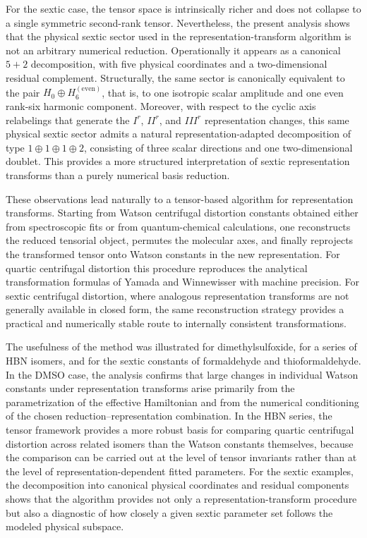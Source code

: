 For the sextic case, the tensor space is intrinsically richer and does
not collapse to a single symmetric second-rank tensor.  Nevertheless,
the present analysis shows that the physical sextic sector used in the
representation-transform algorithm is not an arbitrary numerical
reduction.  Operationally it appears as a canonical $5+2$
decomposition, with five physical coordinates and a two-dimensional
residual complement.  Structurally, the same sector is canonically
equivalent to the pair $H_0\oplus H_6^{(\mathrm{even})}$, that is, to
one isotropic scalar amplitude and one even rank-six harmonic
component.  Moreover, with respect to the cyclic axis relabelings that
generate the $I^r$, $II^r$, and $III^r$ representation changes, this
same physical sextic sector admits a natural representation-adapted
decomposition of type $1\oplus 1\oplus 1\oplus 2$, consisting of three
scalar directions and one two-dimensional doublet.  This provides a
more structured interpretation of sextic representation transforms than
a purely numerical basis reduction.

These observations lead naturally to a tensor-based algorithm for
representation transforms.  Starting from Watson centrifugal distortion
constants obtained either from spectroscopic fits or from
quantum-chemical calculations, one reconstructs the reduced tensorial
object, permutes the molecular axes, and finally reprojects the
transformed tensor onto Watson constants in the new representation.
For quartic centrifugal distortion this procedure reproduces the
analytical transformation formulas of Yamada and Winnewisser with
machine precision.  For sextic centrifugal distortion, where analogous
representation transforms are not generally available in closed form,
the same reconstruction strategy provides a practical and numerically
stable route to internally consistent transformations.

The usefulness of the method was illustrated for dimethylsulfoxide, for
a series of HBN isomers, and for the sextic constants of formaldehyde
and thioformaldehyde.  In the DMSO case, the analysis confirms that
large changes in individual Watson constants under representation
transforms arise primarily from the parametrization of the effective
Hamiltonian and from the numerical conditioning of the chosen
reduction--representation combination.  In the HBN series, the tensor
framework provides a more robust basis for comparing quartic
centrifugal distortion across related isomers than the Watson constants
themselves, because the comparison can be carried out at the level of
tensor invariants rather than at the level of representation-dependent
fitted parameters.  For the sextic examples, the decomposition into
canonical physical coordinates and residual components shows that the
algorithm provides not only a representation-transform procedure but
also a diagnostic of how closely a given sextic parameter set follows
the modeled physical subspace.

